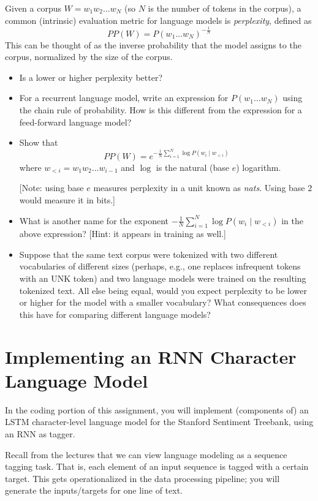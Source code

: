 \documentclass[11pt]{article}
\begin{document}
\vspace{2em}
 Given a corpus $W = w_1 w_2 \dots w_N$ (so $N$ is the number of tokens in the corpus), a common (intrinsic) evaluation metric for language models is \emph{perplexity}, defined as
\[ PP(W) = P(w_1 \dots w_N)^{-\frac{1}{N}} \]
This can be thought of as the inverse probability that the model assigns to the corpus, normalized by the size of the corpus.
\begin{itemize}
  \item Is a lower or higher perplexity better?
  \item For a recurrent language model, write an expression for $P(w_1 \dots w_N)$ using the chain rule of probability.  How is this different from the expression for a feed-forward language model?
  \item Show that
  \[ PP(W) = e^{-\frac{1}{N} \sum_{i=1}^N \log P(w_i \mid w_{<i})} \]
  where $w_{<i} = w_1 w_2 \dots w_{i-1}$ and $\log$ is the natural (base $e$) logarithm.
  
  [Note: using base $e$ measures perplexity in a unit known as \emph{nats}.  Using base $2$ would measure it in bits.]

  \item What is another name for the exponent $-\frac{1}{N} \sum_{i=1}^N \log P(w_i \mid w_{<i})$ in the above expression? [Hint: it appears in training as well.]
  \item Suppose that the same text corpus were tokenized with two different vocabularies of different sizes (perhaps, e.g., one replaces infrequent tokens with an UNK token) and two language models were trained on the resulting tokenized text.  All else being equal, would you expect perplexity to be lower or higher for the model with a smaller vocabulary?  What consequences does this have for comparing different language models?
\end{itemize}


\section{Implementing an RNN Character Language Model}

In the coding portion of this assignment, you will implement (components of) an LSTM character-level language model for the Stanford Sentiment Treebank, using an RNN as tagger.

\vspace{2em}
 Recall from the lectures that we can view language modeling as a sequence tagging task.  That is, each element of an input sequence is tagged with a certain target.  This gets operationalized in the data processing pipeline; you will generate the inputs/targets for one line of text.
\end{document}
